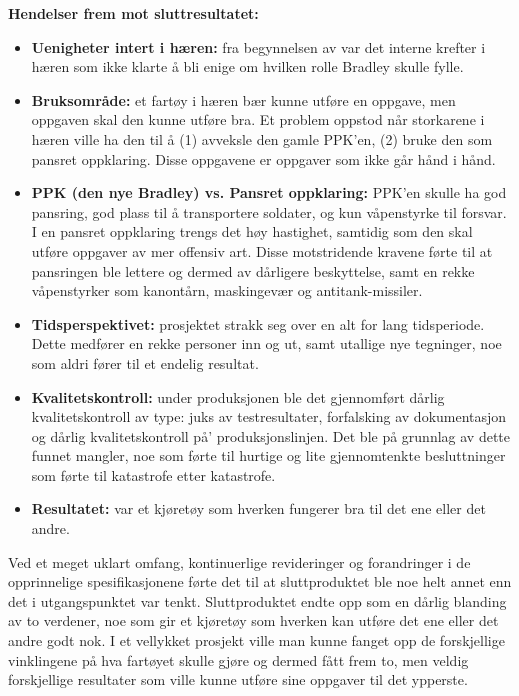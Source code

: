 \clearpage
	{\bf Hendelser frem mot sluttresultatet:}
	\begin{itemize}
		\item {\bf Uenigheter intert i hæren:} fra begynnelsen av var det interne krefter 
		i hæren som ikke klarte å bli enige om hvilken rolle Bradley skulle fylle.
		\item {\bf Bruksområde:} et fartøy i hæren bær kunne utføre en oppgave, men oppgaven
		skal den kunne utføre bra. Et problem oppstod når storkarene i hæren ville ha den til å 
		(1) avveksle den gamle PPK'en, (2) bruke den som pansret oppklaring. Disse oppgavene er
		oppgaver som ikke går hånd i hånd.
		\item {\bf PPK (den nye Bradley) vs. Pansret oppklaring:} PPK'en skulle ha god pansring, god 
		plass til å transportere soldater, og kun våpenstyrke til forsvar. I en pansret oppklaring 
		trengs det høy hastighet, samtidig som den skal utføre oppgaver av mer offensiv art. Disse
		motstridende kravene førte til at pansringen ble lettere og dermed av dårligere beskyttelse, 
		samt en rekke våpenstyrker som kanontårn, maskingevær og antitank-missiler.
		\item {\bf Tidsperspektivet:} prosjektet strakk seg over en alt for lang tidsperiode. Dette
		medfører en rekke personer inn og ut, samt utallige nye tegninger, noe som aldri fører til et
		endelig resultat. 
		\item {\bf Kvalitetskontroll:} under produksjonen ble det gjennomført dårlig kvalitetskontroll 
		av type: juks av testresultater, forfalsking av dokumentasjon og dårlig kvalitetskontroll på'
		produksjonslinjen. Det ble på grunnlag av dette funnet mangler, noe som førte til hurtige
		og lite gjennomtenkte besluttninger som førte til katastrofe etter katastrofe.
		\item {\bf Resultatet:} var et kjøretøy som hverken fungerer bra til det ene eller det andre.
	\end{itemize}

	Ved et meget uklart omfang, kontinuerlige revideringer og forandringer i de opprinnelige spesifikasjonene
	førte det til at sluttproduktet ble noe helt annet enn det i utgangspunktet var tenkt. 
	Sluttproduktet endte opp som en dårlig blanding av to verdener, noe som gir et kjøretøy som hverken
	kan utføre det ene eller det andre godt nok. I et vellykket prosjekt ville man kunne fanget opp
	de forskjellige vinklingene på hva fartøyet skulle gjøre og dermed fått frem to, men veldig forskjellige
	resultater som ville kunne utføre sine oppgaver til det ypperste.

